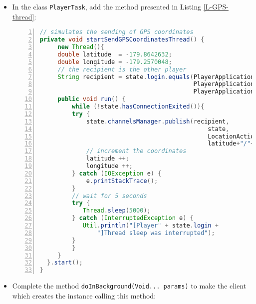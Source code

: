 \begin{enumerate}
\begin{itemize}
\item In the class \texttt{PlayerTask}, add the method presented in
  Listing \ref{L-GPS-thread}:
\begin{lstlisting}[float=htbp,frame=bt,basicstyle=\scriptsize\sffamily,numbers=left,
   numberstyle=\tiny, stepnumber=1,
    numbersep=5pt,language=java,label=L-GPS-thread,caption=Method to send simulated GPS coordinates]
// simulates the sending of GPS coordinates
private void startSendGPSCoordinatesThread() {
     new Thread(){
     double latitude  = -179.8642632;
     double longitude = -179.2570048;
     // the recipient is the other player
     String recipient = state.login.equals(PlayerApplication.INSTANCE_CREATOR_NAME) ? 
                                           PlayerApplication.INSTANCE_JOINER_NAME :
                                           PlayerApplication.INSTANCE_CREATOR_NAME;
     public void run() {
         while (!state.hasConnectionExited()){
	     try {
	         state.channelsManager.publish(recipient,
                                               state,
                                               LocationActionKind.SEND_GPS_COORDINATES, 
                                               latitude+"/"+longitude);
	         // increment the coordinates
	         latitude ++;
	         longitude ++;
	     } catch (IOException e) {
	         e.printStackTrace();
	     }
	     // wait for 5 seconds
	     try {
	        Thread.sleep(5000);
	     } catch (InterruptedException e) {
	        Util.println("[Player" + state.login + 
				"]Thread sleep was interrupted");
	     }
         }
     }
  }.start();
}
\end{lstlisting}
\item Complete the method \texttt{doInBackground(Void... params)} to make
the client which creates the instance calling this method:


\end{itemize}
\end{enumerate}
